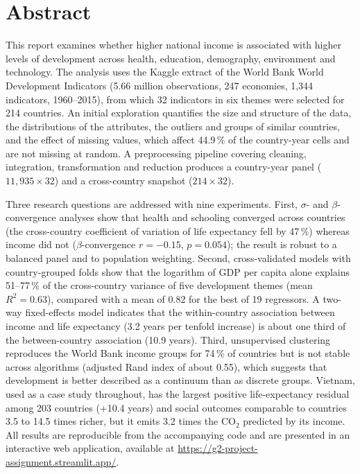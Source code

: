 \documentclass[11pt,a4paper]{article}
\newcommand{\frontsection}[1]{\section*{#1}\addcontentsline{toc}{section}{#1}}
\begin{document}

\frontsection{Abstract}
This report examines whether higher national income is associated with higher levels of development across health, education, demography, environment and technology. The analysis uses the Kaggle extract of the World Bank World Development Indicators (5.66 million observations, 247 economies, 1,344 indicators, 1960--2015), from which 32 indicators in six themes were selected for 214 countries. An initial exploration quantifies the size and structure of the data, the distributions of the attributes, the outliers and groups of similar countries, and the effect of missing values, which affect 44.9\,\% of the country-year cells and are not missing at random. A preprocessing pipeline covering cleaning, integration, transformation and reduction produces a country-year panel ($11{,}935 \times 32$) and a cross-country snapshot ($214 \times 32$).

Three research questions are addressed with nine experiments. First, $\sigma$- and $\beta$-convergence analyses show that health and schooling converged across countries (the cross-country coefficient of variation of life expectancy fell by 47\,\%) whereas income did not ($\beta$-convergence $r = -0.15$, $p = 0.054$); the result is robust to a balanced panel and to population weighting. Second, cross-validated models with country-grouped folds show that the logarithm of GDP per capita alone explains 51--77\,\% of the cross-country variance of five development themes (mean $R^2 = 0.63$), compared with a mean of 0.82 for the best of 19 regressors. A two-way fixed-effects model indicates that the within-country association between income and life expectancy (3.2 years per tenfold increase) is about one third of the between-country association (10.9 years). Third, unsupervised clustering reproduces the World Bank income groups for 74\,\% of countries but is not stable across algorithms (adjusted Rand index of about 0.55), which suggests that development is better described as a continuum than as discrete groups. Vietnam, used as a case study throughout, has the largest positive life-expectancy residual among 203 countries (+10.4 years) and social outcomes comparable to countries 3.5 to 14.5 times richer, but it emits 3.2 times the CO$_2$ predicted by its income. All results are reproducible from the accompanying code and are presented in an interactive web application, available at \url{https://g2-project-assignment.streamlit.app/}.
\end{document}
